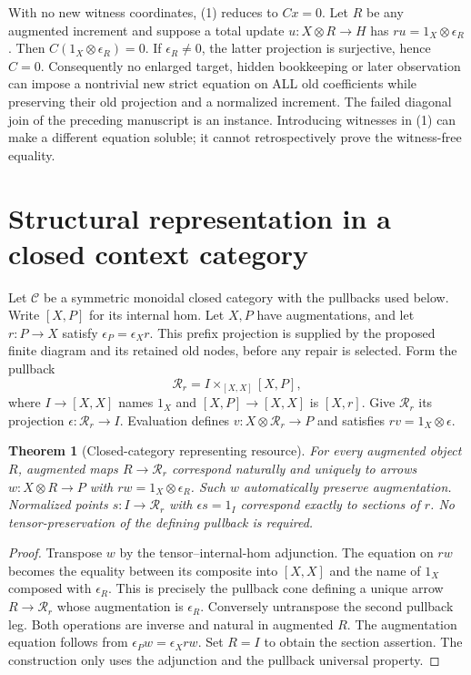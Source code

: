 \documentclass[11pt]{article}
\newtheorem{theorem}{Theorem}\newtheorem{proposition}{Proposition}\newtheorem{lemma}{Lemma}
\begin{document}
With no new witness coordinates, (1) reduces to $Cx=0$. Let $R$ be any augmented increment and suppose a total update $u:X\otimes R\to H$ has $ru=1_X\otimes\epsilon_R$. Then $C(1_X\otimes\epsilon_R)=0$. If $\epsilon_R\ne0$, the latter projection is surjective, hence $C=0$. Consequently no enlarged target, hidden bookkeeping or later observation can impose a nontrivial new strict equation on ALL old coefficients while preserving their old projection and a normalized increment. The failed diagonal join of the preceding manuscript is an instance. Introducing witnesses in (1) can make a different equation soluble; it cannot retrospectively prove the witness-free equality.

\section{Structural representation in a closed context category}
Let $\mathcal C$ be a symmetric monoidal closed category with the pullbacks used below. Write $[X,P]$ for its internal hom. Let $X,P$ have augmentations, and let $r:P\to X$ satisfy $\epsilon_P=\epsilon_Xr$. This prefix projection is supplied by the proposed finite diagram and its retained old nodes, before any repair is selected. Form the pullback
\[
 \mathcal R_r=I\times_{[X,X]}[X,P],\tag{2s}
\]
where $I\to[X,X]$ names $1_X$ and $[X,P]\to[X,X]$ is $[X,r]$. Give $\mathcal R_r$ its projection $\epsilon:\mathcal R_r\to I$. Evaluation defines $v:X\otimes\mathcal R_r\to P$ and satisfies $rv=1_X\otimes\epsilon$.

\begin{theorem}[Closed-category representing resource]
For every augmented object $R$, augmented maps $R\to\mathcal R_r$ correspond naturally and uniquely to arrows $w:X\otimes R\to P$ with $rw=1_X\otimes\epsilon_R$. Such $w$ automatically preserve augmentation. Normalized points $s:I\to\mathcal R_r$ with $\epsilon s=1_I$ correspond exactly to sections of $r$. No tensor-preservation of the defining pullback is required.
\end{theorem}
\begin{proof}
Transpose $w$ by the tensor--internal-hom adjunction. The equation on $rw$ becomes the equality between its composite into $[X,X]$ and the name of $1_X$ composed with $\epsilon_R$. This is precisely the pullback cone defining a unique arrow $R\to\mathcal R_r$ whose augmentation is $\epsilon_R$. Conversely untranspose the second pullback leg. Both operations are inverse and natural in augmented $R$. The augmentation equation follows from $\epsilon_Pw=\epsilon_Xrw$. Set $R=I$ to obtain the section assertion. The construction only uses the adjunction and the pullback universal property.
\end{proof}
\end{document}
